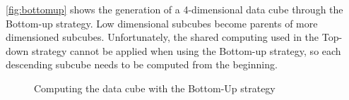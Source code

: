 \autoref{fig:bottomup} shows the generation of a 4-dimensional data cube through the Bottom-up strategy.
Low dimensional subcubes become parents of more dimensioned subcubes.
Unfortunately, the shared computing used in the Top-down strategy cannot be applied when using the Bottom-up strategy, so each descending subcube needs to be computed from the beginning.

\begin{figure}[!htb]
  \caption{Computing the data cube with the Bottom-Up strategy}\label{fig:bottomup}
  \vspace{4mm}
  \begin{center}
  \end{center}
  \vspace{2mm}
  \legenda{}
\end{figure}

